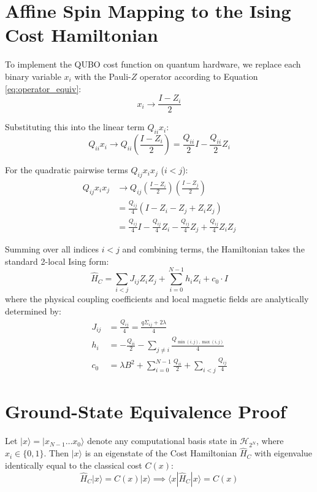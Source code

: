 \section{Affine Spin Mapping to the Ising Cost Hamiltonian}
To implement the QUBO cost function on quantum hardware, we replace each binary variable $x_i$ with the Pauli-$Z$ operator according to Equation \eqref{eq:operator_equiv}:
\begin{equation}
x_i \longrightarrow \frac{I - Z_i}{2}
\end{equation}

Substituting this into the linear term $Q_{ii} x_i$:
\begin{equation}
Q_{ii} x_i \longrightarrow Q_{ii} \left( \frac{I - Z_i}{2} \right) = \frac{Q_{ii}}{2} I - \frac{Q_{ii}}{2} Z_i
\end{equation}

For the quadratic pairwise terms $Q_{ij} x_i x_j$ ($i < j$):
\begin{align}
Q_{ij} x_i x_j &\longrightarrow Q_{ij} \left( \frac{I - Z_i}{2} \right) \left( \frac{I - Z_j}{2} \right) \nonumber \\
&= \frac{Q_{ij}}{4} \left( I - Z_i - Z_j + Z_i Z_j \right) \nonumber \\
&= \frac{Q_{ij}}{4} I - \frac{Q_{ij}}{4} Z_i - \frac{Q_{ij}}{4} Z_j + \frac{Q_{ij}}{4} Z_i Z_j
\end{align}

Summing over all indices $i < j$ and combining terms, the Hamiltonian takes the standard 2-local Ising form:
\begin{equation}
\label{eq:cost_hamiltonian}
\hat{H}_C = \sum_{i < j} J_{ij} Z_i Z_j + \sum_{i=0}^{N-1} h_i Z_i + c_0 \cdot I
\end{equation}
where the physical coupling coefficients and local magnetic fields are analytically determined by:
\begin{align}
J_{ij} &= \frac{Q_{ij}}{4} = \frac{q \Sigma_{ij} + 2\lambda}{4} \label{eq:ising_j} \\
h_i &= -\frac{Q_{ii}}{2} - \sum_{j \neq i} \frac{Q_{\min(i,j), \max(i,j)}}{4} \label{eq:ising_h} \\
c_0 &= \lambda B^2 + \sum_{i=0}^{N-1} \frac{Q_{ii}}{2} + \sum_{i < j} \frac{Q_{ij}}{4} \label{eq:ising_c0}
\end{align}

\section{Ground-State Equivalence Proof}
\begin{theorem}
Let $|x\rangle = |x_{N-1} \dots x_0\rangle$ denote any computational basis state in $\mathcal{H}_{2^N}$, where $x_i \in \{0, 1\}$. Then $|x\rangle$ is an eigenstate of the Cost Hamiltonian $\hat{H}_C$ with eigenvalue identically equal to the classical cost $C(x)$:
\begin{equation}
\hat{H}_C |x\rangle = C(x) |x\rangle \implies \langle x | \hat{H}_C | x \rangle = C(x)
\end{equation}
\end{theorem}

